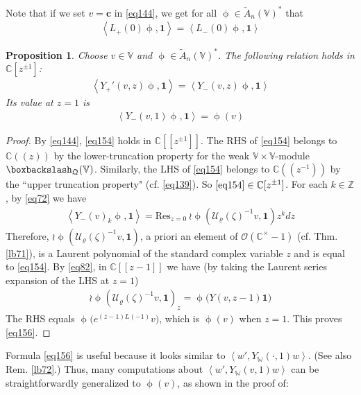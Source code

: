 \documentclass[11pt,b5paper,notitlepage]{article}
\theoremstyle{definition}
\theoremstyle{plain}
\newtheorem{pp}[df]{Proposition}
\newcommand{\mc}{\mathcal}
\newcommand{\wtd}{\widetilde}
\newcommand{\idt}{\mathbf{1}}
\newcommand{\Res}{\mathrm{Res}}
\newcommand{\Vbb}{\mathbb V}
\newcommand{\Wbb}{\mathbb W}
\newcommand{\Cbb}{\mathbb C}
\newcommand{\Zbb}{\mathbb Z}
\newcommand{\cbf}{\mathbf c}
\newcommand{\ibf}{\mathbf 1}
\newcommand{\<}{\left\langle}
\renewcommand{\>}{\right\rangle}
\newcommand{\MU}{\mathcal{U}}
\newcommand{\bbs}{\boxbackslash}
\newcommand{\fq}{{\mathfrak Q}}
\numberwithin{equation}{section}
\begin{document}
Note that if we set $v=\cbf$ in \eqref{eq144}, we get for all $\upphi\in\wtd A_n(\Vbb)^*$ that 
         \begin{align}\label{zhu16}
             \<L_+(0)\upphi,\ibf\>=\<L_-(0)\upphi,\ibf\>
         \end{align}












\begin{pp}\label{lb67}
Choose $v\in\Vbb$ and $\upphi\in \wtd A_n(\Vbb)^*$.  The following relation holds in $\Cbb[z^{\pm1}]$:
\begin{align}\label{eq154}
\<Y_+'(v,z)\upphi,\idt\>=\<Y_-(v,z)\upphi,\ibf\>
\end{align}
Its value at $z=1$ is
\begin{align}\label{eq156}
\<Y_-(v,1)\upphi,\ibf\>=\upphi(v)
\end{align}
\end{pp}



\begin{proof}
By \eqref{eq144}, \eqref{eq154} holds in $\Cbb[[z^{\pm1}]]$. The RHS of \eqref{eq154} belongs to $\Cbb((z))$ by the lower-truncation property for the weak $\Vbb\times\Vbb$-module $\bbs_\fq(\Vbb)$. Similarly, the LHS of \eqref{eq154} belongs to $\Cbb((z^{-1}))$ by the ``upper truncation property" (cf. \eqref{eq139}). So  $\eqref{eq154}\in\Cbb[z^{\pm1}]$. For each $k\in\Zbb$, by \eqref{eq72} we have
\begin{align*}
 \<Y_-(v)_k\upphi,\ibf\>=\Res_{z=0}~{\wr\upphi}(\mc U_\varrho(\zeta)^{-1}v,\idt)z^kdz
\end{align*}
Therefore, $\wr\upphi(\mc U_\varrho(\zeta)^{-1}v,\idt)$, a priori an element of $\mc O(\Cbb^\times-1)$ (cf. Thm. \ref{lb71}), is a Laurent polynomial of the standard complex variable $z$ and is equal to \eqref{eq154}. By \eqref{eq82}, in $\Cbb[[z-1]]$ we have (by taking the Laurent series expansion of the LHS at $z=1$)
\begin{align}
\wr \upphi(\MU_\varrho(\zeta)^{-1}v,\ibf)_z=\upphi\big(Y(v,z-1)\idt \big)  \label{eq141}
\end{align}
The RHS equals $\upphi\big(e^{(z-1)L(-1)}v\big)$, which is $\upphi(v)$ when $z=1$. This proves \eqref{eq156}.
\end{proof}


Formula \eqref{eq156} is useful because it looks similar to $\<w',Y_\Wbb(\cdot,1)w\>$. (See also Rem. \ref{lb72}.) Thus, many computations about $\<w',Y_\Wbb(v,1)w\>$ can be straightforwardly generalized to $\upphi(v)$, as shown in the proof of:
\end{document}
